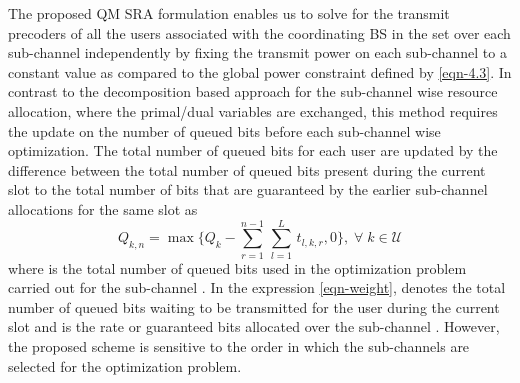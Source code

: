 The proposed \acl{QM} \ac{SRA} formulation enables us to solve for the transmit precoders of all the users associated with the coordinating \ac{BS} in the set  over each sub-channel independently by fixing the transmit power on each sub-channel to a constant value  as compared to the global power constraint defined by \eqref{eqn-4.3}. In contrast to the decomposition based approach for the sub-channel wise resource allocation, where the primal/dual variables are exchanged, this method requires the update on the number of queued bits before each sub-channel wise optimization. The total number of queued bits for each user are updated by the difference between the total number of queued bits present during the current slot to the total number of bits that are guaranteed by the earlier sub-channel allocations for the same slot as
\begin{equation}
Q_{k,n} = \max{\Big \lbrace Q_k - \sum_{r = 1}^{n-1} \, \sum_{l = 1}^{L} \, t_{l,k,r} ,0 \Big \rbrace }, \; \forall \; k \in \mathcal{U}
\label{eqn-weight}
\end{equation}
where  is the total number of queued bits used in the optimization problem carried out for the sub-channel . In the expression \eqref{eqn-weight},  denotes the total number of queued bits waiting to be transmitted for the user  during the current slot and  is the rate or guaranteed bits allocated over the sub-channel . However, the proposed scheme is sensitive to the order in which the sub-channels are selected for the optimization problem. 
%
